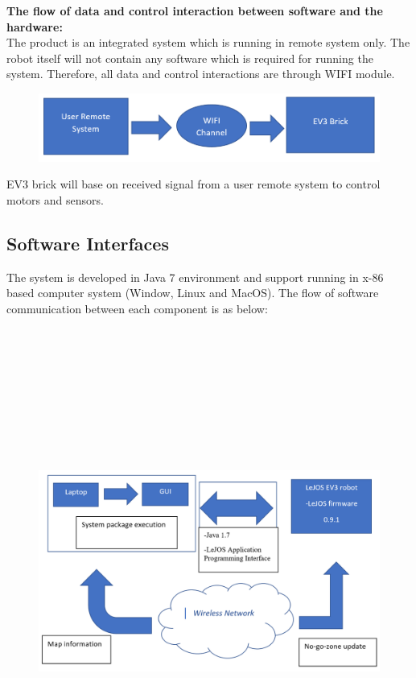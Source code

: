\documentclass[10pt,a4paper,titlepage]{article}
\begin{document}
\textbf{The flow of data and control interaction between software and the hardware:}\\

The product is an integrated system which is running in remote system only. The robot itself will not contain any software which is required for running the system. Therefore, all data and control interactions are through WIFI module.\\

\begin{figure}[h]
	\includegraphics[width=\linewidth]{data_and_control.PNG}
	\label{fig:Flow of data and control interaction}
\end{figure}

EV3 brick will base on received signal from a user remote system to control motors and sensors.\\

\subsection{Software Interfaces}

The system is developed in Java 7 environment and support running in x-86 based computer system (Window, Linux and MacOS). The flow of software communication between each component is as below:\\\\\\\\\\\\\\\\\\\\

\begin{figure}[h]
	\includegraphics[width=\linewidth]{software_interface.PNG}
	\label{fig:Flow of software communication}
\end{figure}
\end{document}
